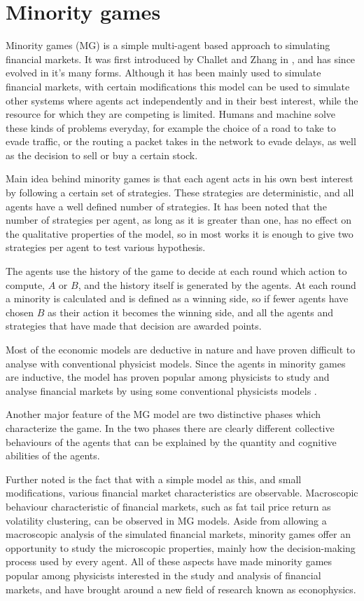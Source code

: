 \chapter{Minority games}
\label{chapter:minority}

Minority games (MG) is a simple multi-agent based approach to simulating financial markets. 
It was first introduced by Challet and Zhang in \cite{challet1997emergence}, and has since evolved in it's many forms.
Although it has been mainly used to simulate financial markets, with certain modifications this model can be used to simulate other systems where agents act independently and in their best interest, while the resource for which they are competing is limited.
Humans and machine solve these kinds of problems everyday, for example the choice of a road to take to evade traffic, or the routing a packet takes in the network to evade delays, as well as the decision to sell or buy a certain stock.

Main idea behind minority games is that each agent acts in his own best interest by following a certain set of strategies.
These strategies are deterministic, and all agents have a well defined number of strategies.
It has been noted that the number of strategies per agent, as long as it is greater than one, has no effect on the qualitative properties of the model, so in most works it is enough to give two strategies per agent to test various hypothesis.

The agents use the history of the game to decide at each round which action to compute, $A$ or $B$, and the history itself is generated by the agents.
At each round a minority is calculated and is defined as a winning side, so if fewer agents have chosen $B$ as their action it becomes the winning side, and all the agents and strategies that have made that decision are awarded points.

Most of the economic models are deductive in nature and have proven difficult to analyse with conventional physicist models.
Since the agents in minority games are inductive, the model has proven popular among physicists to study and analyse financial markets by using some conventional physicists models \cite{yeung2009minority}.

Another major feature of the MG model are two distinctive phases which characterize the game.
In the two phases there are clearly different collective behaviours of the agents that can be explained by the quantity and cognitive abilities of the agents.

Further noted is the fact that with a simple model as this, and small modifications, various financial market characteristics are observable.
Macroscopic behaviour characteristic of financial markets, such as fat tail price return as volatility clustering, can be observed in MG models.
Aside from allowing a macroscopic analysis of the simulated financial markets, minority games offer an opportunity to study the microscopic properties, mainly how the decision-making process used by every agent. 
All of these aspects have made minority games popular among physicists interested in the study and analysis of financial markets, and have brought around a new field of research known as econophysics.

